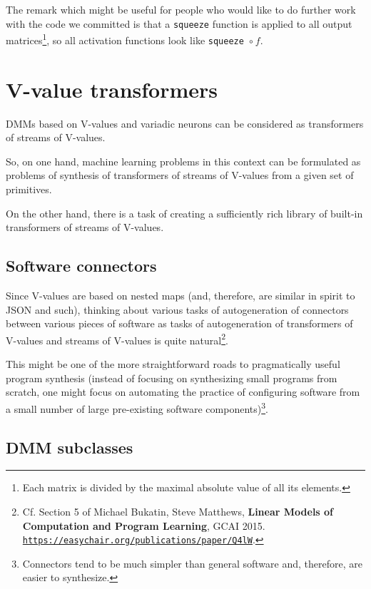 \documentclass{article}
\begin{document}
The remark which might be useful for people who would like to do further work
with the code we committed is that a {\tt squeeze} function  is applied to all output matrices\footnote{Each matrix is divided by the maximal absolute value of all its elements.}, so all activation functions look like {\tt squeeze}\ $\circ\ f$.

\section{V-value transformers}\label{sec:transformers}

DMMs based on V-values and variadic neurons can be considered as transformers of streams of V-values.

So, on one hand, machine learning problems in this context can be formulated as problems of synthesis of
transformers of streams of V-values from a given set of primitives.

On the other hand, there is a task of creating a sufficiently rich library of built-in transformers of streams of V-values.

\subsection{Software connectors}

Since V-values are based on nested maps (and, therefore, are similar in spirit to JSON and such), thinking about
various tasks of autogeneration of connectors between various pieces of software as tasks of autogeneration of
transformers of V-values and streams of V-values is quite natural\footnote{Cf. Section 5 of Michael Bukatin, Steve Matthews,
{\bf Linear Models of Computation and Program Learning}, GCAI 2015. \href{https://easychair.org/publications/paper/Q4lW}
{\tt https://easychair.org/publications/paper/Q4lW}.}.

This might be one of the more straightforward roads to pragmatically useful program synthesis (instead of focusing on
synthesizing small programs from scratch, one might focus on automating the practice of configuring software from
a small number of large pre-existing software components)\footnote{Connectors tend to be much simpler than general
software and, therefore, are easier to synthesize.}. 

\subsection{DMM subclasses}
\end{document}
